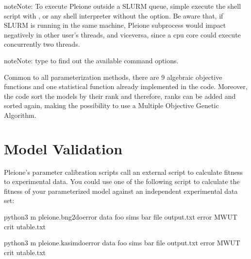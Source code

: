 \documentclass[letterpaper,10pt,english]{sphinxmanual}
\begin{document}
\begin{sphinxadmonition}{note}{Note:}
 To execute Pleione outside a SLURM
queue, simple execute the shell script with ,  or any shell
interpreter without the  option. Be aware that, if SLURM is
running in the same machine, Pleione subprocess would impact negatively in
other user’s threads, and viceversa, since a cpu core could execute
concurrently two threads.
\end{sphinxadmonition}

\begin{sphinxadmonition}{note}{Note:}
 type  to find out the
available command options.
\end{sphinxadmonition}

Common to all parameterization methods, there are 9 algebraic objective
functions and one statistical function already implemented in the code.
Moreover, the code sort the models by their rank and therefore, ranks can be
added and sorted again, making the possibility to use a Multiple Objective
Genetic Algorithm.


\section{Model Validation}
\label{\detokenize{Validation:model-validation}}\label{\detokenize{Validation::doc}}
Pleione’s parameter calibration scripts call an external script to calculate
fitness to experimental data. You could use one of the following script to
calculate the fitness of your parameterized model against an independent
experimental data set:

\begin{sphinxVerbatim}[commandchars=\\\{\}]
python3 \PYGZhy{}m pleione.bng2\PYGZhy{}doerror \PYGZhy{}\PYGZhy{}data foo \PYGZhy{}\PYGZhy{}sims bar 
\PYGZhy{}\PYGZhy{}file output.txt \PYGZhy{}\PYGZhy{}error MWUT \PYGZhy{}\PYGZhy{}crit utable.txt
\end{sphinxVerbatim}


\begin{sphinxVerbatim}[commandchars=\\\{\}]
python3 \PYGZhy{}m pleione.kasim\PYGZhy{}doerror \PYGZhy{}\PYGZhy{}data foo \PYGZhy{}\PYGZhy{}sims bar 
\PYGZhy{}\PYGZhy{}file output.txt \PYGZhy{}\PYGZhy{}error MWUT \PYGZhy{}\PYGZhy{}crit utable.txt
\end{sphinxVerbatim}
\end{document}
